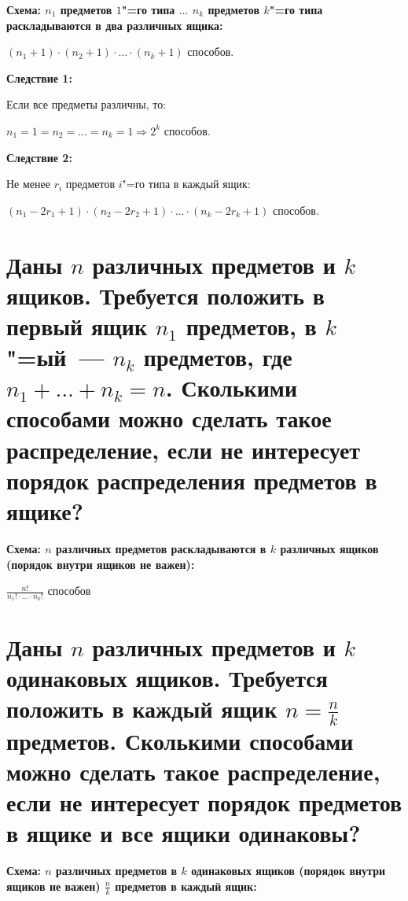 \textbf{Схема: $n_1$ предметов $1$"=го типа $\dots$ $n_k$ предметов $k$"=го типа
раскладываются в два различных ящика:}
    \smallskip

    \begin{center}
        $(n_1 + 1) \cdot (n_2 + 1) \cdot \dots \cdot (n_k + 1)$ способов.
    \end{center}
    \bigskip
 
\textbf{Следствие 1:}
    \smallskip
    
    Если все предметы различны, то:

    \begin{center}
        $n_1 = 1 = n_2 = \dots = n_k = 1 \Rightarrow 2^k$ способов.
    \end{center}
    \bigskip

\textbf{Следствие 2:}
    \smallskip
    
    Не менее $r_i$ предметов $i$"=го типа в каждый ящик:

    \begin{center}
        $(n_1 - 2r_1 + 1) \cdot (n_2 - 2r_2 + 1) \cdot \dots 
        \cdot (n_k - 2r_k + 1)$ способов.
    \end{center}

\section{Даны $n$ различных предметов и $k$ ящиков. Требуется положить в первый
ящик $n_1$ предметов, в $k$"=ый~--- $n_k$ предметов, где $n_1 + \dots + n_k = n$.
Сколькими способами можно сделать такое распределение, если не интересует порядок
распределения предметов в ящике?}    

\textbf{Схема: $n$ различных предметов раскладываются в $k$ различных
ящиков (порядок внутри ящиков не важен):}
    \smallskip

    \begin{center}
        $\frac{n!}{n_1! \cdot \dots \cdot n_k!}$ способов
    \end{center}

\section{Даны $n$ различных предметов и $k$ одинаковых ящиков. Требуется положить в 
каждый ящик $n = \frac{n}{k}$ предметов. Сколькими способами можно сделать такое 
распределение, если не интересует порядок предметов в ящике и все ящики 
одинаковы?}    

\textbf{Схема: $n$ различных предметов в $k$ одинаковых ящиков
(порядок внутри ящиков не важен) $\frac{n}{k}$ предметов в каждый ящик:}
    \smallskip

